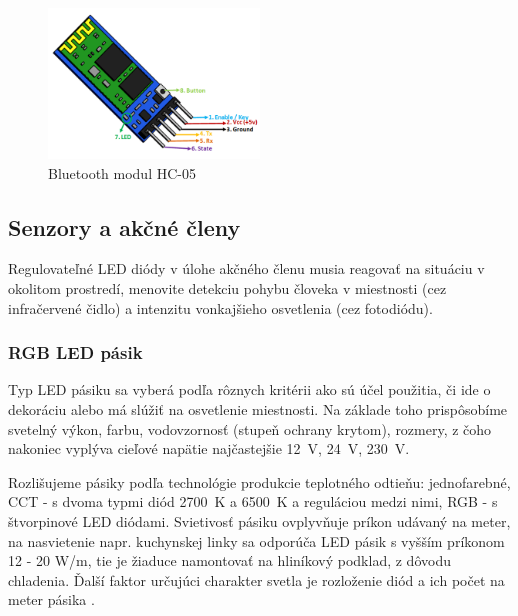\documentclass[12pt, a4paper]{article}
\begin{document}
\begin{figure}[h]
	\centering
	\includegraphics[width=0.5\textwidth]{assets/hc-05.png}
	\caption{Bluetooth modul HC-05 \cite{noauthor_hc-05_nodate}}
	\label{fig:hc-05}
\end{figure}

\subsection{Senzory a akčné členy}
Regulovateľné LED diódy v úlohe akčného členu musia reagovať na situáciu v okolitom prostredí, menovite detekciu pohybu človeka v miestnosti (cez infračervené čidlo) a intenzitu vonkajšieho osvetlenia (cez fotodiódu). 

\subsubsection{RGB LED pásik}
Typ LED pásiku sa vyberá podľa rôznych kritérii ako sú účel použitia, či ide o dekoráciu alebo má slúžiť na osvetlenie miestnosti. Na základe toho prispôsobíme svetelný výkon, farbu, vodovzornosť (stupeň ochrany krytom), rozmery, z čoho nakoniec vyplýva cieľové napätie najčastejšie 12~V, 24~V, 230~V. 

Rozlišujeme pásiky podľa technológie produkcie teplotného odtieňu: jednofarebné, CCT - s dvoma typmi diód 2700~K a 6500~K a reguláciou medzi nimi, RGB - s štvorpinové LED diódami. Svietivosť pásiku ovplyvňuje príkon udávaný na meter, na nasvietenie napr. kuchynskej linky sa odporúča LED pásik s vyšším príkonom 12 - 20 W/m, tie je žiaduce namontovať na hliníkový podklad, z dôvodu chladenia. Ďalší faktor určujúci charakter svetla je rozloženie diód a ich počet na meter pásika \cite{123ledsk_ako_nodate}.
\end{document}

